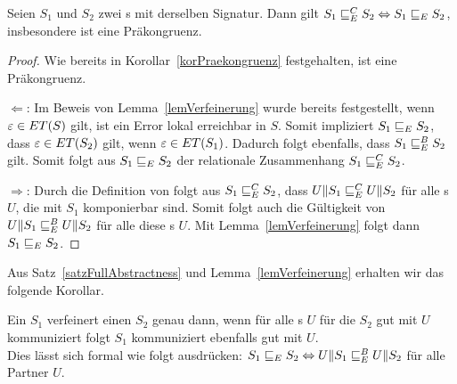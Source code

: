 \begin{satz}
  \label{satzFullAbstractness}
  Seien $S_1$ und $S_2$ zwei \EIO{}s mit derselben Signatur. Dann gilt
  $S_1\sqsubseteq _E^C S_2\Leftrightarrow S_1\sqsubseteq _E S_2$, insbesondere ist \ERel{}
  eine Präkongruenz.
\end{satz}

\begin{proof}
  Wie bereits in Korollar~\ref{korPraekongruenz} festgehalten, ist \ERel{} eine
  Präkongruenz.

  \glqq $\Leftarrow$\grqq : Im Beweis von Lemma~\ref{lemVerfeinerung} wurde
  bereits festgestellt, wenn
      $\varepsilon\in ET{}(S)$ gilt, ist ein Error lokal erreichbar in $S$.
      Somit impliziert $S_1\sqsubseteq _E S_2$, dass $\varepsilon\in
      ET{}(S_2)$ gilt, wenn $\varepsilon\in ET{}(S_1)$. Dadurch folgt ebenfalls,
      dass $S_1\sqsubseteq _E^B S_2$ gilt. Somit folgt aus $S_1\sqsubseteq _E S_2$ der relationale
      Zusammenhang $S_1\sqsubseteq _E^C S_2$.

      \glqq $\Rightarrow$\grqq : Durch die Definition von \ECRel{} folgt aus
  $S_1\sqsubseteq _E^C S_2$, dass $U\|S_1\sqsubseteq _E^C U\|S_2$ für alle \EIO{}s $U$, die mit
  $S_1$ komponierbar sind. Somit folgt auch die Gültigkeit von
  $U\|S_1\sqsubseteq _E^B U\|S_2$ für alle diese \EIO{}s $U$. Mit
  Lemma~\ref{lemVerfeinerung} folgt dann $S_1\sqsubseteq _E S_2$.
\end{proof}

Aus Satz~\ref{satzFullAbstractness} und Lemma~\ref{lemVerfeinerung} erhalten
wir das folgende Korollar.

\begin{kor}
  Ein \EIO{} $S_1$ verfeinert einen \EIO{} $S_2$ genau dann, wenn für alle \EIO{}s $U$
  für die $S_2$ gut mit $U$ kommuniziert folgt $S_1$ kommuniziert
  ebenfalls gut mit $U$.\\
  Dies lässt sich formal wie folgt ausdrücken: $S_1\sqsubseteq _E S_2
  \Leftrightarrow U\|S_1\sqsubseteq _E^B U\|S_2$ für alle Partner $U$.
\end{kor}
